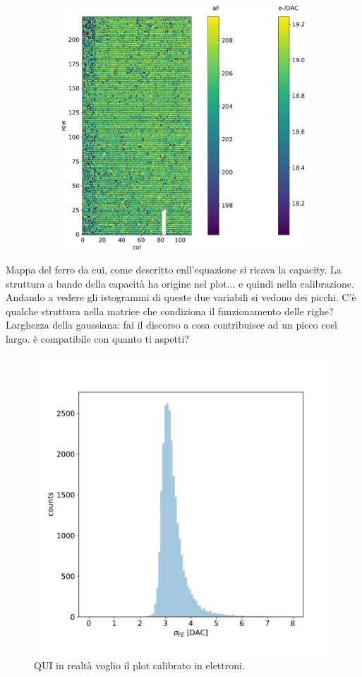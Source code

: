 \begin{figure}[h!]
\begin{subfigure}{.5\textwidth}
            \includegraphics[width=.9\linewidth]{figures/charaterization/conversion_factor_map.pdf}
            \label{fig:}
            \end{subfigure}
            \caption{}
        \end{figure}  

       Mappa del ferro da cui, come descritto enll'equazione si ricava la capacity.        
       La struttura a bande della capacità ha origine nel plot... e quindi nella calibrazione. 
       Andando a vedere gli istogrammi di queste due variabili si vedono dei picchi. C'è qualche struttura nella matrice che condiziona il funzionamento delle righe?
       Larghezza della gaussiana: fai il discorso a cosa contribuisce ad un picco così largo. è compatibile con quanto ti aspetti?
        

        \begin{figure}[h!]
            \centering
            \includegraphics[width=.50\linewidth]{figures/charaterization/Fe_width_DAC_hist.pdf}
            \caption{QUI in realtà voglio il plot calibrato in elettroni.}
            \label{fig:Fe_width_DAC_hist}
        \end{figure} 


